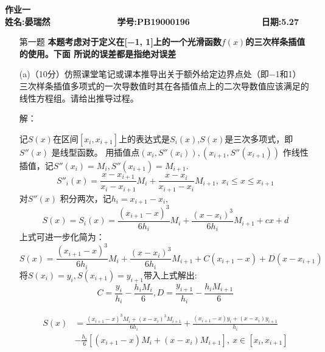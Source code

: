 \documentclass[12pt,a4paper,utf8]{ctexart}
\begin{document}


\begin{center}
\textbf{作业一}\\
\textbf{姓名:晏瑞然~~~~~~~~~~~~~ 学号:PB19000196~~~~~~~~~~~~~~ 日期:5.27}\\
\end{center}

\begin{center}
\fbox{
\begin{minipage}{40em}
\vspace{5cm}
\hspace{20cm}
\end{minipage}}
\end{center}
\vspace{1cm}

\begin{enumerate}
\item[第一题] \textbf{本题考虑对于定义在[−1, 1]上的一个光滑函数$f(x)$的三次样条插值的使用。下面
所说的误差都是指绝对误差}  

(a)（10分）仿照课堂笔记或课本推导出关于额外给定边界点处（即−1和1）
三次样条插值多项式的一次导数值时其在各插值点上的二次导数值应该满足的
线性方程组。请给出推导过程。
\newline

解：

记$S(x)$在区间$[x_i,x_{i+1}]$上的表达式是$S_i(x)$,$S(x)$是三次多项式，即$ S''(x) $ 是线型函数。
用插值点$ {(x_i,S''(x_i)),(x_{i+1},S''(x_{i+1}))}   $ 作线性插值，记$ S''(x_i)=M_i,S''(x_{i+1})=M_{i+1}. $ 
$$ S''_i(x) = \frac{x-x_{i+1}}{x_i-x_{i+1}} M_i + \frac{x-x_i}{x_{i+1}-x_i} M_{i+1}  ,\   x_i \leq x \leq x_{i+1} $$ 
对$ S''(x) $ 积分两次，记$ h_i=x_{i+1}-x_i, $ 
$$ S(x)=S_i(x)=\frac{(x_{i+1}-x)^3}{6h_i} M_i +\frac{(x-x_i)^3}{6h_i} M_{i+1} + cx + d $$
上式可进一步化简为：
$$ S(x)= \frac{(x_{i+1}-x)^3}{6h_i} M_i +\frac{(x-x_i)^3}{6h_i} M_{i+1} + C(x_{i+1}-x) + D(x-x_{i+1}) $$
将$ S(x_i)=y_i,S(x_{i+1})=y_{i+1} $带入上式解出:
$$ C=\frac{y_i}{h_i} -\frac{h_iM_i}{6} ,D = \frac{y_{i+1}}{h_i}-\frac{h_iM_{i+1}}{6}   $$ 
   
   \begin{equation}
      \begin{split}
         S(x) & = \frac{(x_{i+1}-x)^3M_i+(x-x_i)^3M_{i+1}}{6h_i} + \frac{(x_{i+1}-x)y_i+(x-x_i)y_{i+1}}{h_i}\\
         & -\frac{h_i}{6}[(x_{i+1}-x)M_{i}+(x-x_i)M_{i+1}] , \ x\in [x_i,x_{i+1}]
         \end{split}
      \end{equation}
         

\end{enumerate}
\end{document}
